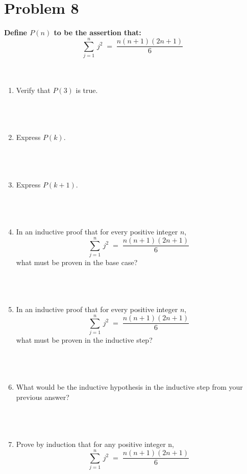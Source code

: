 \documentclass{amsart}
\theoremstyle{definition}
\theoremstyle{Exercise}
\theoremstyle{remark}
\theoremstyle{rule}
\numberwithin{equation}{section}
\begin{document}
\section*{Problem 8}
{\bf Define $P(n)$ to be the assertion that:}\\
\[\displaystyle \sum_{j=1}^{n}\, j^2 \;=\;\frac{n(n+1)(2n+1)}{6}\]\\\\
\begin{enumerate}[label=(\alph*)]
  \item Verify that $P(3)$ is true.\\\\
   \\\\
  \item Express $P(k)$.\\\\
   \\\\
  \item Express $P(k+1)$.\\\\
   \\\\
   \item In an inductive proof that for every positive integer $n$,
   \[\displaystyle \sum_{j=1}^{n}\, j^2 \;=\;\frac{n(n+1)(2n+1)}{6}\]
   what must be proven in the base case?\\\\
    \\\\
    \item In an inductive proof that for every positive integer $n$,
   \[\displaystyle \sum_{j=1}^{n}\, j^2 \;=\;\frac{n(n+1)(2n+1)}{6}\]
   what must be proven in the inductive step?\\\\
   \\\\
   \item What would be the inductive hypothesis in the inductive step from your previous answer?\\\\
    \\\\
   \item Prove by induction that for any positive integer n,
   \[\displaystyle \sum_{j=1}^{n}\, j^2 \;=\;\frac{n(n+1)(2n+1)}{6}\] \\\\
\end{enumerate}
\end{document}
